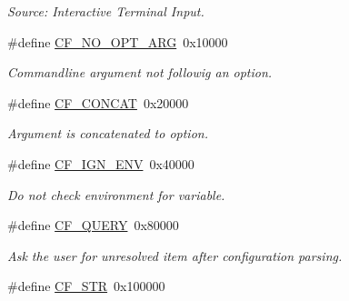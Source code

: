 \begin{CompactItemize}
\begin{CompactList}\small\item\em Source: Interactive Terminal Input. \item\end{CompactList}\item 
\hypertarget{group__special__options__mask_g97d17b070dac10c14d3930c58bfba76f}{
\#define \hyperlink{group__special__options__mask_g97d17b070dac10c14d3930c58bfba76f}{CF\_\-NO\_\-OPT\_\-ARG}~0x10000}
\label{group__special__options__mask_g97d17b070dac10c14d3930c58bfba76f}

\begin{CompactList}\small\item\em Commandline argument not followig an option. \item\end{CompactList}\item 
\hypertarget{group__special__options__mask_g9e526dae88bf6803772107ff283637b5}{
\#define \hyperlink{group__special__options__mask_g9e526dae88bf6803772107ff283637b5}{CF\_\-CONCAT}~0x20000}
\label{group__special__options__mask_g9e526dae88bf6803772107ff283637b5}

\begin{CompactList}\small\item\em Argument is concatenated to option. \item\end{CompactList}\item 
\hypertarget{group__special__options__mask_g72b75851880f36aaa5a52fdfe7960cca}{
\#define \hyperlink{group__special__options__mask_g72b75851880f36aaa5a52fdfe7960cca}{CF\_\-IGN\_\-ENV}~0x40000}
\label{group__special__options__mask_g72b75851880f36aaa5a52fdfe7960cca}

\begin{CompactList}\small\item\em Do not check environment for variable. \item\end{CompactList}\item 
\hypertarget{group__special__options__mask_ge39e0d9b4e9af8c6d4b3676783dd26e0}{
\#define \hyperlink{group__special__options__mask_ge39e0d9b4e9af8c6d4b3676783dd26e0}{CF\_\-QUERY}~0x80000}
\label{group__special__options__mask_ge39e0d9b4e9af8c6d4b3676783dd26e0}

\begin{CompactList}\small\item\em Ask the user for unresolved item after configuration parsing. \item\end{CompactList}\item 
\hypertarget{group__special__options__mask_g64c30a2865061d0c1074bc6ec91e3dcf}{
\#define \hyperlink{group__special__options__mask_g64c30a2865061d0c1074bc6ec91e3dcf}{CF\_\-STR}~0x100000}
\label{group__special__options__mask_g64c30a2865061d0c1074bc6ec91e3dcf}


\end{CompactItemize}
